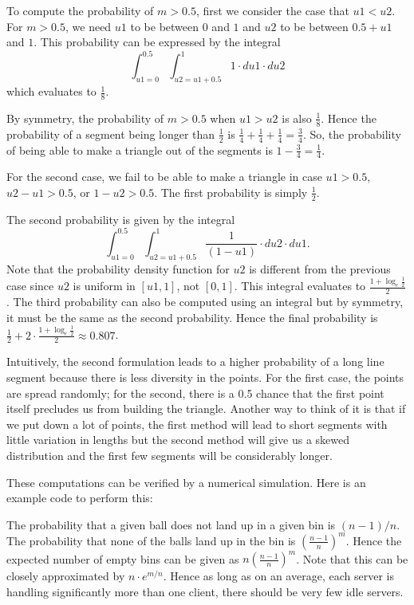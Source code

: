 To compute the probability of $m > 0.5$, first we consider the case
that $u1 < u2$. For $m > 0.5$, we need $u1$ to be between 0 and $1$ and $u2$ to be between $0.5 + u1$ and $1$. This probability can
be expressed by the integral
\[
\int_{u1=0}^{0.5} \int_{u2=u1+0.5}^{1} 1 \cdot du1 \cdot du2  
\]
which evaluates to $\frac{1}{8}$.

By symmetry, the probability of $m > 0.5$ when $u1 > u2$ is also $\frac{1}{8}$.
Hence the probability of a segment being longer than $\frac{1}{2}$ 
is $\frac{1}{4} + \frac{1}{4} + \frac{1}{4} = \frac{3}{4}$.
So, the probability of being able to make a triangle out of the segments
is $1 - \frac{3}{4} = \frac{1}{4}$.

For the second case, we fail to be able to make a triangle
in case $u1 > 0.5$, $u2 - u1 > 0.5$, or $1-u2 > 0.5$. The first
probability is simply $\frac{1}{2}$.

The second probability is given by the integral
\[
\int _{u1=0}^{0.5} \int_{u2=u1+0.5}^{1} \frac{1}{(1-u1)} \cdot du2 \cdot du1 .
\]
Note that the probability density function for $u2$ is different from the previous
case since $u2$ is uniform in $[u1,1]$, not $[0,1]$.
This integral evaluates to $\frac{1 + \log_e{\frac{1}{2}}}{2}$.
The third probability can also be computed using an integral but by symmetry,
it must be the same as the second probability.
Hence the final probability is $\frac{1}{2} + 2 \cdot \frac{1 + \log_e{\frac{1}{2}}}{2} \approx 0.807$.

Intuitively, the second formulation leads to a higher probability of a long line segment
because there is less diversity in the points. For the first case, the points are spread
randomly; for the second, there is a 0.5 chance that the first point itself precludes
us from building the triangle.  Another way to think of it is that if we put down a lot of points, the first method will lead to short segments with little variation in lengths but the second method will give us a skewed distribution and the first few segments will be considerably longer.

These computations can be verified by a numerical simulation. Here is an example code to perform this:


The probability that a given ball does not land up in a given bin is
$(n-1)/n$. The probability that none of the balls land up in the bin
is $\left(\frac{n-1}{n}\right)^m$.  Hence the expected number of empty
bins can be given as $n\left(\frac{n-1}{n}\right)^m$. Note that this
can be closely approximated by $n\cdot e^{m/n}$. Hence as long as on
an average, each server is handling significantly more than one
client, there should be very few idle servers.

